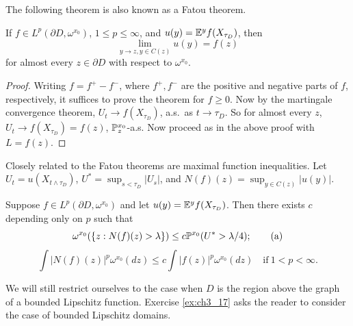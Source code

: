 The following theorem is also known as a Fatou theorem.

\begin{theorem}\label{thm:ch3_4.4}
If $f \in L^p(\partial D,\omega^{x_0})$, $1 \leq p \leq \infty$, and $u(y) = \E^yf(X_{\tau_D})$, then
\[
    \lim_{y \to z,y \in C(z)} u(y) = f(z)
\]
for almost every $z \in \partial D$ with respect to $\omega^{x_0}$.
\end{theorem}

\begin{proof}
Writing $f = f^+ - f^-$, where $f^+,f^-$ are the positive and negative parts of $f$, respectively, it suffices to prove the theorem for $f \geq 0$. Now by the martingale convergence theorem, $U_t \to f(X_{\tau_D})$, a.s.\ as $t \to \tau_D$. So for almost every $z$, $U_t \to f(X_{\tau_D}) = f(z)$, $\P_z^{x_0}$-a.s. Now proceed as in the above proof with $L = f(z)$.
\end{proof}



Closely related to the Fatou theorems are maximal function inequalities. Let $U_t = u(X_{t \wedge \tau_D})$, $U^* = \sup_{s < \tau_D} |U_s|$, and $N(f)(z) = \sup_{y \in C(z)} |u(y)|$.

\begin{theorem}\label{thm:ch3_4.5}
Suppose $f \in L^p(\partial D,\omega^{x_0})$ and let $u(y) = \E^yf(X_{\tau_D})$. Then there exists $c$ depending only on $p$ such that
\begin{equation}
    \omega^{x_0}(\{z: N(f)(z) > \lambda\}) \leq c\P^{x_0}(U^* > \lambda/4); \tag{a}
\end{equation}
\begin{equation}
    \int |N(f)(z)|^p\omega^{x_0}(dz) \leq c \int |f(z)|^p\omega^{x_0}(dz) \quad \text{if}~1 < p < \infty. \tag{b}
\end{equation}
\end{theorem}

We will still restrict ourselves to the case when $D$ is the region above
the graph of a bounded Lipschitz function. Exercise \ref{ex:ch3_17} asks the reader to
consider the case of bounded Lipschitz domains.

